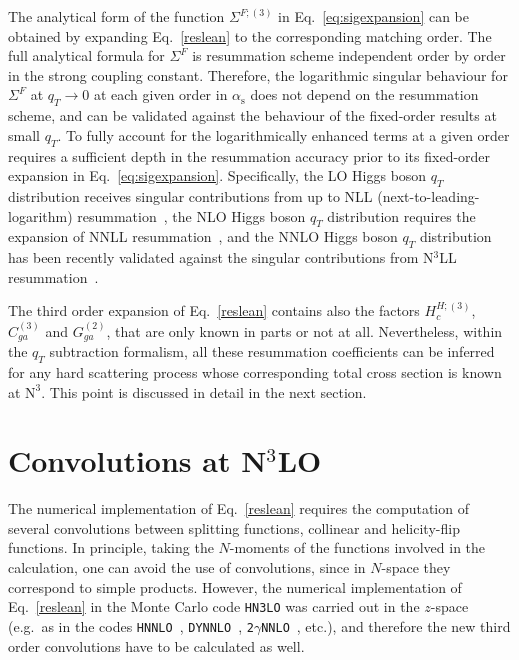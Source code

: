 \documentclass[12pt]{article}
\DeclareRobustCommand{\alphas}{\ensuremath{\alpha_{\mathrm{s}}}\xspace}
\DeclareRobustCommand{\as}{\alphas}
\DeclareRobustCommand{\qt}{\ensuremath{q_T}\xspace}
\DeclareRobustCommand{\LO}{\text{LO}\xspace}
\DeclareRobustCommand{\N}[1]{\ensuremath{\text{N}^{#1}}} %
\begin{document}
\begin{appendix}
{\color{black!30}
The analytical form of the function $\Sigma^{F;(3)}$ in Eq.~\eqref{eq:sigexpansion} can be obtained by expanding Eq.~\eqref{reslean} to the corresponding matching order. The full analytical formula for $\Sigma^{F}$ is resummation scheme independent order by order in the strong coupling constant. Therefore, the logarithmic singular behaviour for $\Sigma^{F}$ at $\qt\rightarrow 0$ at 
each given order in $\as$ does not depend on the 
resummation scheme, and can be validated against the behaviour of the fixed-order results at small $\qt$. To fully 
account for the logarithmically enhanced terms at a given order requires a sufficient depth in the resummation accuracy prior to 
its fixed-order expansion in Eq.~\eqref{eq:sigexpansion}. Specifically, the LO Higgs boson $\qt$ distribution receives singular contributions from up to NLL (next-to-leading-logarithm) resummation~\cite{Catani:1988vd,Kauffman:1991cx}, the NLO Higgs boson $\qt$ distribution requires the expansion of NNLL resummation~\cite{deFlorian:2001zd,deFlorian:2000pr,Becher:2012yn,Neill:2015roa}, and the NNLO Higgs boson $\qt$ distribution has been recently validated against the singular contributions from N$^3$LL resummation~\cite{Chen:2018pzu,Bizon:2018foh}. 

The third order expansion of Eq.~\eqref{reslean} contains also the factors $H^{H;(3)}_{c}$, $C^{(3)}_{ga}$ and $G^{(2)}_{ga}$,  that are only known in parts or not at all. Nevertheless, within the $\qt$ subtraction  formalism, all these resummation coefficients can be inferred for any hard scattering process whose corresponding total cross section is known at \N3\LO. This point is discussed in detail in the next section.
}


\section{Convolutions at \texorpdfstring{N${}^\text{3}$LO}{N3LO}}
\label{app:Convos}

The numerical implementation of Eq.~\eqref{reslean} requires the computation of several convolutions between splitting functions, collinear and helicity-flip functions. In principle, taking the $N$-moments of the functions involved in the calculation, one can avoid the use of convolutions, since in $N$-space they correspond to simple products. However, the numerical implementation of Eq.~\eqref{reslean} in the Monte Carlo code \texttt{HN3LO} was carried out in the $z$-space (e.g.\ as in the codes \texttt{HNNLO}~\cite{Catani:2007vq}, \texttt{DYNNLO}~\cite{Catani:2009sm}, \texttt{2$\gamma$NNLO}~\cite{Catani:2011qz}, etc.), and therefore the new third order convolutions have to be calculated as well. 


\end{appendix}
\end{document}

